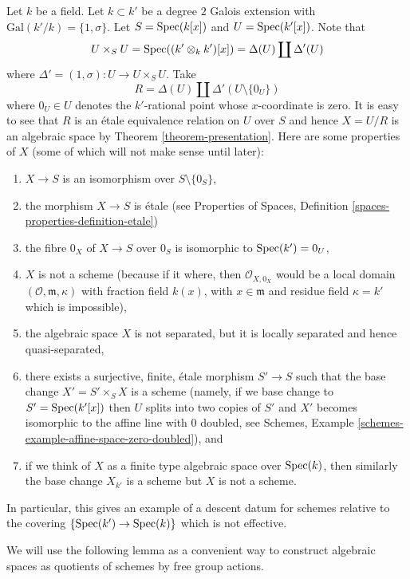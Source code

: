 \begin{example}
\label{example-non-representable-descent}
Let $k$ be a field. Let $k \subset k'$ be a degree $2$ Galois extension
with $\text{Gal}(k'/k) = \{1, \sigma\}$. Let $S = \mathop{\rm Spec}(k[x])$
and $U = \mathop{\rm Spec}(k'[x])$. Note that
$$
U \times_S U =
\mathop{\rm Spec}((k' \otimes_k k')[x]) =
\Delta(U) \coprod \Delta'(U)
$$
where $\Delta' = (1, \sigma) : U \to U \times_S U$. Take
$$
R = \Delta(U) \coprod \Delta'(U \setminus \{0_U\})
$$
where $0_U \in U$ denotes the $k'$-rational point whose $x$-coordinate is zero.
It is easy to see that $R$ is an \'etale equivalence relation on $U$ over $S$
and hence $X = U/R$ is an algebraic space by
Theorem \ref{theorem-presentation}. Here are some properties of $X$ (some
of which will not make sense until later):
\begin{enumerate}
\item $X \to S$ is an isomorphism over $S \setminus \{0_S\}$,
\item the morphism $X \to S$ is \'etale (see
Properties of Spaces,
Definition \ref{spaces-properties-definition-etale})
\item the fibre $0_X$ of $X \to S$ over $0_S$ is isomorphic to
$\mathop{\rm Spec}(k') = 0_U$,
\item $X$ is not a scheme (because if it where, then $\mathcal{O}_{X, 0_X}$
would be a local domain $(\mathcal{O}, \mathfrak m, \kappa)$ with
fraction field $k(x)$, with $x \in \mathfrak m$ and residue field
$\kappa = k'$ which is impossible),
\item the algebraic space $X$ is not separated, but it is
locally separated and hence quasi-separated,
\item there exists a surjective, finite, \'etale morphism $S' \to S$
such that the base change $X' = S' \times_S X$ is a scheme (namely, if
we base change to $S' = \mathop{\rm Spec}(k'[x])$ then $U$ splits into
two copies of $S'$ and $X'$ becomes isomorphic to the affine line with
$0$ doubled, see
Schemes, Example \ref{schemes-example-affine-space-zero-doubled}), and
\item if we think of $X$ as a finite type algebraic space over
$\mathop{\rm Spec}(k)$, then similarly the base change $X_{k'}$ is a scheme
but $X$ is not a scheme.
\end{enumerate}
In particular, this gives an example of a descent datum for schemes
relative to the covering $\{\mathop{\rm Spec}(k') \to \mathop{\rm Spec}(k)\}$
which is not effective.
\end{example}

\noindent
We will use the following lemma as a convenient way to construct
algebraic spaces as quotients of schemes by free group actions.

